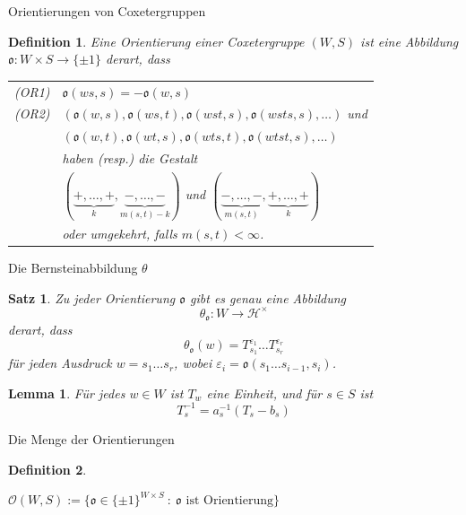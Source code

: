 \documentclass[pdf]{beamer}
\newtheorem*{satz*}{Satz}
\newtheorem*{lemma*}{Lemma}
\newtheorem*{def*}{Definition}
\begin{document}
\begin{frame}{Orientierungen von Coxetergruppen}
   \begin{def*}
      Eine \textit{Orientierung} einer Coxetergruppe $(W,S)$ ist eine Abbildung $\mathfrak{o}: W\times S \rightarrow \{\pm 1\}$ derart, dass\\[8pt]
      \pause[2]\begin{tabular}{rl}
         (OR1) & $\mathfrak{o}(ws,s) = -\mathfrak{o}(w,s)$ \\[10pt]
         \pause[3](OR2) & $(\mathfrak{o}(w, s), \mathfrak{o}(ws, t), \mathfrak{o}(wst, s), \mathfrak{o}(wsts, s), \dots)$ \pause[4] und \\[3pt]
         & $(\mathfrak{o}(w, t), \mathfrak{o}(wt, s), \mathfrak{o}(wts, t), \mathfrak{o}(wtst, s), \dots)$ \\[3pt]
         \pause[5] & haben (resp.) die Gestalt \\[5pt]
         & $(\underbrace{+, \dots, +}_k, \underbrace{-, \dots, -}_{m(s,t)-k})$ und $(\underbrace{-, \dots, -}_{m(s,t)}, \underbrace{+, \dots, +}_k)$ \\[20pt]
         & \pause[6] oder umgekehrt\pause[7], falls $m(s,t) < \infty$.
      \end{tabular}
   \end{def*}
\end{frame}

\begin{frame}{Die Bernsteinabbildung $\theta$}
   \begin{satz*}
      Zu jeder Orientierung $\mathfrak{o}$ gibt es genau eine Abbildung
      \[ \theta_\mathfrak{o}: W \longrightarrow \mathcal{H}^\times \]
      derart, dass\pause[2]
      \[ \theta_\mathfrak{o}(w) = T_{s_1}^{\varepsilon_1} \dots T_{s_r}^{\varepsilon_r} \]
      \pause[3]für jeden Ausdruck $w = s_1 \dots s_r$, \pause[4] wobei $\varepsilon_i = \mathfrak{o}(s_1 \dots s_{i-1}, s_i)$.
   \end{satz*}
   \pause[6]\begin{lemma*}
      Für jedes $w \in W$ ist $T_w$ eine Einheit, und für $s \in S$ ist
      \[ T_s^{-1} = a_s^{-1}(T_s - b_s) \]
   \end{lemma*}
\end{frame}

\begin{frame}{Die Menge der Orientierungen}
   \begin{def*}
      \begin{center}$\mathcal{O}(W,S) := \{ \mathfrak{o} \in \{\pm 1\}^{W\times S}\ :\ \text{$\mathfrak{o}$ ist Orientierung}\}$\end{center}
   \end{def*}
\end{frame}
\end{document}
